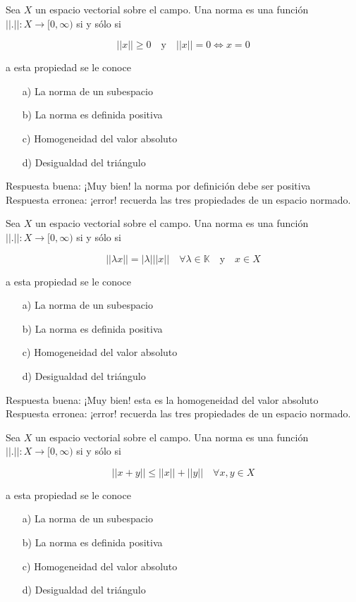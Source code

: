 \documentclass{exam}
\begin{document}
\begin{questions}
\question Sea $X$ un espacio vectorial sobre el campo. Una norma es una función $||.|| : X \to [0,\infty)$ si y sólo si

\[||x|| \geq 0 \quad \text{y} \quad ||x|| = 0 \Leftrightarrow x = 0\]

a esta propiedad se le conoce

\begin{itemize}
\item[a)] La norma de un subespacio
\item[b)] La norma es definida positiva
\item[c)] Homogeneidad del valor absoluto
\item[d)] Desigualdad del triángulo
\end{itemize}

Respuesta buena: ¡Muy bien! la norma por definición debe ser positiva\\
Respuesta erronea: ¡error! recuerda las tres propiedades de un espacio normado.

\question Sea $X$ un espacio vectorial sobre el campo. Una norma es una función $||.|| : X \to [0,\infty)$ si y sólo si

\[||\lambda x||  = |\lambda| ||x|| \quad \forall \lambda \in \mathbb{K} \quad \text{y} \quad x \in X\]

a esta propiedad se le conoce

\begin{itemize}
\item[a)] La norma de un subespacio
\item[b)] La norma es definida positiva
\item[c)] Homogeneidad del valor absoluto
\item[d)] Desigualdad del triángulo
\end{itemize}

Respuesta buena: ¡Muy bien! esta es la homogeneidad del valor absoluto\\
Respuesta erronea: ¡error! recuerda las tres propiedades de un espacio normado.

\question Sea $X$ un espacio vectorial sobre el campo. Una norma es una función $||.|| : X \to [0,\infty)$ si y sólo si

\[||x+y|| \leq ||x|| + ||y|| \quad \forall x, y \in X  \]

a esta propiedad se le conoce

\begin{itemize}
\item[a)] La norma de un subespacio
\item[b)] La norma es definida positiva
\item[c)] Homogeneidad del valor absoluto
\item[d)] Desigualdad del triángulo
\end{itemize}


\end{questions}
\end{document}

